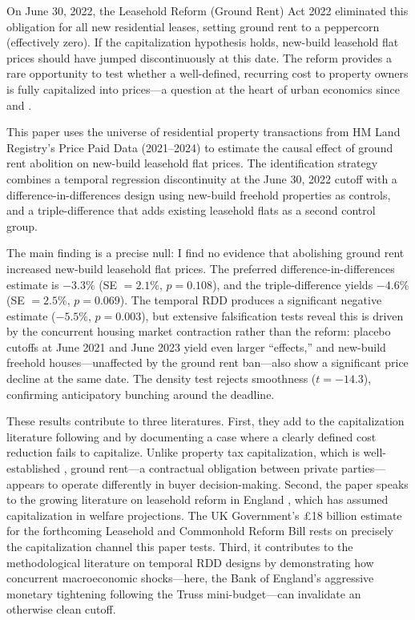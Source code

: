 \documentclass[12pt]{article}
\begin{document}
On June 30, 2022, the Leasehold Reform (Ground Rent) Act 2022 eliminated this obligation for all new residential leases, setting ground rent to a peppercorn (effectively zero). If the capitalization hypothesis holds, new-build leasehold flat prices should have jumped discontinuously at this date. The reform provides a rare opportunity to test whether a well-defined, recurring cost to property owners is fully capitalized into prices---a question at the heart of urban economics since \citet{oates1969} and \citet{rosen1974hedonic}.

This paper uses the universe of residential property transactions from HM Land Registry's Price Paid Data (2021--2024) to estimate the causal effect of ground rent abolition on new-build leasehold flat prices. The identification strategy combines a temporal regression discontinuity at the June 30, 2022 cutoff with a difference-in-differences design using new-build freehold properties as controls, and a triple-difference that adds existing leasehold flats as a second control group.

The main finding is a precise null: I find no evidence that abolishing ground rent increased new-build leasehold flat prices. The preferred difference-in-differences estimate is $-3.3\%$ (SE $= 2.1\%$, $p = 0.108$), and the triple-difference yields $-4.6\%$ (SE $= 2.5\%$, $p = 0.069$). The temporal RDD produces a significant negative estimate ($-5.5\%$, $p = 0.003$), but extensive falsification tests reveal this is driven by the concurrent housing market contraction rather than the reform: placebo cutoffs at June 2021 and June 2023 yield even larger ``effects,'' and new-build freehold houses---unaffected by the ground rent ban---also show a significant price decline at the same date. The density test rejects smoothness ($t = -14.3$), confirming anticipatory bunching around the deadline.

These results contribute to three literatures. First, they add to the capitalization literature following \citet{oates1969} and \citet{cellini2010value} by documenting a case where a clearly defined cost reduction fails to capitalize. Unlike property tax capitalization, which is well-established \citep{palmon1998capitalization}, ground rent---a contractual obligation between private parties---appears to operate differently in buyer decision-making. Second, the paper speaks to the growing literature on leasehold reform in England \citep{law_commission_2020, wallace2019}, which has assumed capitalization in welfare projections. The UK Government's \pounds 18 billion estimate for the forthcoming Leasehold and Commonhold Reform Bill rests on precisely the capitalization channel this paper tests. Third, it contributes to the methodological literature on temporal RDD designs \citep{hausman2018} by demonstrating how concurrent macroeconomic shocks---here, the Bank of England's aggressive monetary tightening following the Truss mini-budget---can invalidate an otherwise clean cutoff.
\end{document}
